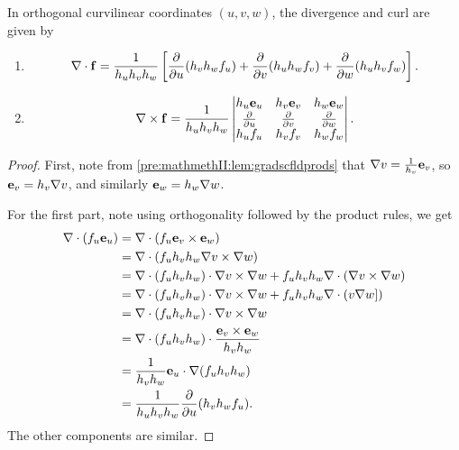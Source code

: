 \documentclass[10pt, a4paper]{article}
\begin{document}
\begin{proposition}
    In orthogonal curvilinear coordinates $(u, v, w)$,
    the divergence and curl are given by
    \begin{enumerate}[label = (\roman*)]
        \item
        \[
        \mathbf{\nabla} \cdot \mathbf{f} = \frac{1}{h_uh_vh_w}\left[\frac{\partial }{\partial u}(h_vh_wf_u) + \frac{\partial }{\partial v}(h_uh_wf_v) + \frac{\partial }{\partial w}(h_uh_vf_w)\right].
        \]
        
        \item
        \[
        \mathbf{\nabla} \times \mathbf{f} = \frac{1}{h_uh_vh_w}\begin{vmatrix}
            h_u\mathbf{e}_u & h_v\mathbf{e}_v & h_w\mathbf{e}_w \\
            \frac{\partial }{\partial u} & \frac{\partial }{\partial v} & \frac{\partial }{\partial w} \\
            h_uf_u & h_vf_v & h_wf_w
        \end{vmatrix}.
        \]
    \end{enumerate}

    \begin{proof}
        First,
        note from \autoref{pre:mathmethII:lem:gradscfldprods} that $\mathbf{\nabla} v = \frac{1}{h_v}\mathbf{e}_v$,
        so $\mathbf{e}_v = h_v\mathbf{\nabla} v$,
        and similarly $\mathbf{e}_w = h_w\mathbf{\nabla} w$.

        For the first part,
        note using orthogonality followed by the product rules,
        we get
        \begin{align*}
            \mathbf{\nabla} \cdot (f_u\mathbf{e}_u) &= \mathbf{\nabla} \cdot (f_u\mathbf{e}_v \times \mathbf{e}_w) \\
            &= \mathbf{\nabla} \cdot (f_uh_vh_w \mathbf{\nabla} v \times \mathbf{\nabla} w) \\
            &= \mathbf{\nabla} \cdot (f_uh_vh_w) \cdot \mathbf{\nabla} v \times \mathbf{\nabla} w + f_uh_vh_w\mathbf{\nabla} \cdot (\mathbf{\nabla} v \times \mathbf{\nabla} w) \\
            &= \mathbf{\nabla} \cdot (f_uh_vh_w) \cdot \mathbf{\nabla} v \times \mathbf{\nabla} w + f_uh_vh_w\mathbf{\nabla} \cdot (v \mathbf{\nabla} w]) \\
            &= \mathbf{\nabla} \cdot (f_uh_vh_w) \cdot \mathbf{\nabla} v \times \mathbf{\nabla} w \\
            &= \mathbf{\nabla} \cdot (f_uh_vh_w) \cdot \frac{\mathbf{e}_v \times \mathbf{e}_w}{h_vh_w} \\
            &= \frac{1}{h_vh_w}\mathbf{e}_u \cdot \mathbf{\nabla}(f_uh_vh_w) \\
            &= \frac{1}{h_uh_vh_w}\frac{\partial }{\partial u}(h_vh_wf_u).
        \end{align*}
        The other components are similar.


\end{proof}
\end{proposition}
\end{document}
